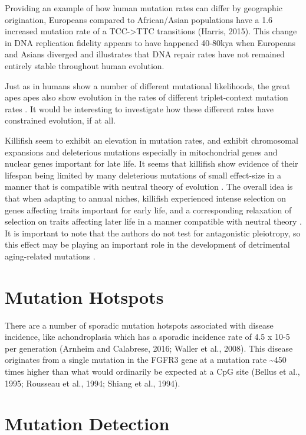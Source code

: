 \documentclass[]{book}
\begin{document}
Providing an example of how human mutation rates can differ by
geographic origination, Europeans compared to African/Asian populations
have a 1.6 increased mutation rate of a TCC-\textgreater{}TTC
transitions (Harris, 2015). This change in DNA replication fidelity
appears to have happened 40-80kya when Europeans and Asians diverged and
illustrates that DNA repair rates have not remained entirely stable
throughout human evolution.

Just as in humans show a number of different mutational likelihoods, the
great apes apes also show evolution in the rates of different
triplet-context mutation rates \citep{harris2017rapid}. It would be
interesting to investigate how these different rates have constrained
evolution, if at all.

Killifish seem to exhibit an elevation in mutation rates, and exhibit
chromosomal expansions and deleterious mutations especially in
mitochondrial genes and nuclear genes important for late life. It seems
that killifish show evidence of their lifespan being limited by many
deleterious mutations of small effect-size in a manner that is
compatible with neutral theory of evolution
\citep{ohta1973model, kimura1968evolutionary}. The overall idea is that
when adapting to annual niches, killifish experienced intense selection
on genes affecting traits important for early life, and a corresponding
relaxation of selection on traits affecting later life in a manner
compatible with neutral theory \citep{cui2019relaxed}. It is important
to note that the authors do not test for antagonistic pleiotropy, so
this effect may be playing an important role in the development of
detrimental aging-related mutations
\citep{charlesworth2000degeneration, williams1957pleiotropy}.

\section{Mutation Hotspots}\label{mutation-hotspots}

There are a number of sporadic mutation hotspots associated with disease
incidence, like achondroplasia which has a sporadic incidence rate of
4.5 x 10-5 per generation (Arnheim and Calabrese, 2016; Waller et al.,
2008). This disease originates from a single mutation in the FGFR3 gene
at a mutation rate \textasciitilde{}450 times higher than what would
ordinarily be expected at a CpG site (Bellus et al., 1995; Rousseau et
al., 1994; Shiang et al., 1994).

\section{Mutation Detection}\label{mutation-detection}
\end{document}
